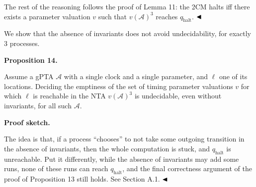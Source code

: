 \documentclass[10pt,a4paper]{article}
\begin{document}
 
 
The rest of the reasoning follows the proof of Lemma 11: the 2CM halts iff there exists a parameter valuation $v$ such that ${v(\mathcal{A})}^{3}$ reaches $q_{\textrm{halt}}$. $\hfill\blacktriangleleft$\par
 
 
 
We show that the absence of invariants does not avoid undecidability, for exactly 3 processes.\par
 
 
 
\par\medskip\noindent\textbf{Proposition 14.}\par
 
 
Assume a gPTA $\mathcal{A}$ with a single clock and a single parameter, and $\mathrm{\ell}$ one of its locations. Deciding the emptiness of the set of timing parameter valuations $v$ for which $\mathrm{\ell}$ is reachable in the NTA ${v(\mathcal{A})}^{3}$ is undecidable, even without invariants, for all such $\mathcal{A}$.\par
 
 
 
 
 
\par\medskip\noindent\textbf{Proof sketch.}\par
 
 
The idea is that, if a process “chooses” to not take some outgoing transition in the absence of invariants, then the whole computation is stuck, and $q_{\textrm{halt}}$ is unreachable. Put it differently, while the absence of invariants may add some runs, none of these runs can reach $q_{\textrm{halt}}$, and the final correctness argument of the proof of Proposition 13 still holds. See Section A.1. $\hfill\blacktriangleleft$\par
 
 
\end{document}
